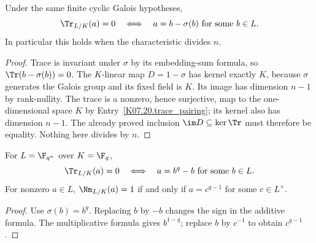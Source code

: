 \begin{theorem}
Under the same finite cyclic Galois hypotheses,
\[\Tr_{L/K}(a)=0\quad\Longleftrightarrow\quad a=b-\sigma(b)\text{ for some }b\in L.\]
In particular this holds when the characteristic divides $n$.
\end{theorem}
\begin{proof}
Trace is invariant under $\sigma$ by its embedding-sum formula, so $\Tr(b-\sigma(b))=0$. The $K$-linear map $D=1-\sigma$ has kernel exactly $K$, because $\sigma$ generates the Galois group and its fixed field is $K$. Its image has dimension $n-1$ by rank-nullity. The trace is a nonzero, hence surjective, map to the one-dimensional space $K$ by Entry~\ref{K07.20.trace_pairing}; its kernel also has dimension $n-1$. The already proved inclusion $\im D\subseteq\ker\Tr$ must therefore be equality. Nothing here divides by $n$.
\end{proof}
\begin{corollary}
For $L=\F_{q^n}$ over $K=\F_q$,
\[\Tr_{L/K}(a)=0\quad\Longleftrightarrow\quad a=b^q-b\text{ for some }b\in L.\]
For nonzero $a\in L$, $\Nm_{L/K}(a)=1$ if and only if $a=c^{q-1}$ for some $c\in L^\times$.
\end{corollary}
\begin{proof}
Use $\sigma(b)=b^q$. Replacing $b$ by $-b$ changes the sign in the additive formula. The multiplicative formula gives $b^{1-q}$; replace $b$ by $c^{-1}$ to obtain $c^{q-1}$.
\end{proof}

